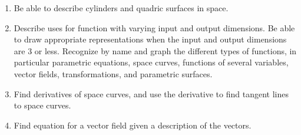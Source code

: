 

\begin{enumerate}
\item Be able to describe cylinders and quadric surfaces in space.
\item Describe uses for function with varying input and output
  dimensions.  Be able to draw appropriate representations when the
  input and output dimensions are 3 or less. Recognize by name and
  graph the different types of functions, in particular parametric
  equations, space curves, functions of several variables, vector
  fields, transformations, and parametric surfaces.
\item Find derivatives of space curves, and use the derivative to find
  tangent lines to space curves.
\item Find equation for a vector field given a description of the vectors.
\end{enumerate}


